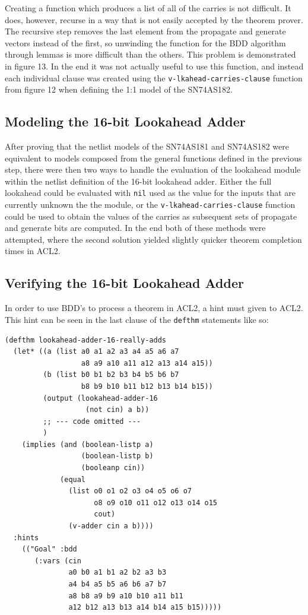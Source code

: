 \documentclass[fleqn,10pt]{SelfArx} %
\begin{document}
Creating a function which produces a list of all of the carries is not difficult. It does, however, recurse in a way that is not easily accepted by the theorem prover. The recursive step removes the last element from the propagate and generate vectors instead of the first, so unwinding the function for the BDD algorithm through lemmas is more difficult than the others. This problem is demonstrated in figure 13. In the end it was not actually useful to use this function, and instead each individual clause was created using the \lstinline{v-lkahead-carries-clause} function from figure 12 when defining the 1:1 model of the SN74AS182.

\subsection{Modeling the 16-bit Lookahead Adder}
After proving that the netlist models of the SN74AS181 and SN74AS182 were equivalent to models composed from the general functions defined in the previous step, there were then two ways to handle the evaluation of the lookahead module within the netlist definition of the 16-bit lookahead adder. Either the full lookahead could be evaluated with \lstinline{nil} used as the value for the inputs that are currently unknown the the module, or the \lstinline{v-lkahead-carries-clause} function could be used to obtain the values of the carries as subsequent sets of propagate and generate bits are computed. In the end both of these methods were attempted, where the second solution yielded slightly quicker theorem completion times in ACL2. 

\subsection{Verifying the 16-bit Lookahead Adder}
In order to use BDD's to process a theorem in ACL2, a hint must given to ACL2. This hint can be seen in the last clause of the \lstinline{defthm} statements like so:

\begin{lstlisting}
(defthm lookahead-adder-16-really-adds
  (let* ((a (list a0 a1 a2 a3 a4 a5 a6 a7 
                  a8 a9 a10 a11 a12 a13 a14 a15))
         (b (list b0 b1 b2 b3 b4 b5 b6 b7 
                  b8 b9 b10 b11 b12 b13 b14 b15))
         (output (lookahead-adder-16 
                   (not cin) a b))
         ;; --- code omitted ---
         )
    (implies (and (boolean-listp a)
                  (boolean-listp b)
                  (booleanp cin))
             (equal 
               (list o0 o1 o2 o3 o4 o5 o6 o7
                     o8 o9 o10 o11 o12 o13 o14 o15 
                     cout)
               (v-adder cin a b))))
  :hints 
    (("Goal" :bdd 
       (:vars (cin
               a0 b0 a1 b1 a2 b2 a3 b3
               a4 b4 a5 b5 a6 b6 a7 b7
               a8 b8 a9 b9 a10 b10 a11 b11
               a12 b12 a13 b13 a14 b14 a15 b15)))))
\end{lstlisting}
\end{document}
